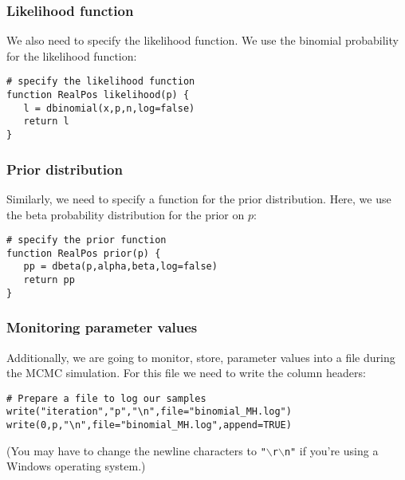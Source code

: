 \subsubsection{Likelihood function}
We also need to specify the likelihood function.
We use the binomial probability for the likelihood function:
{\tt \begin{snugshade*}
\begin{lstlisting}
# specify the likelihood function
function RealPos likelihood(p) {
   l = dbinomial(x,p,n,log=false)
   return l
}
\end{lstlisting}
\end{snugshade*}}

\subsubsection{Prior distribution}
Similarly, we need to specify a function for the prior distribution.
Here, we use the beta probability distribution for the prior on $p$:
{\tt \begin{snugshade*}
\begin{lstlisting}    
# specify the prior function
function RealPos prior(p) {
   pp = dbeta(p,alpha,beta,log=false)
   return pp
}
\end{lstlisting}
\end{snugshade*}}


\subsubsection{Monitoring parameter values}
Additionally, we are going to monitor, \IE store, parameter values into a file during the MCMC simulation.
For this file we need to write the column headers:
{\tt \begin{snugshade*}
\begin{lstlisting}    
# Prepare a file to log our samples
write("iteration","p","\n",file="binomial_MH.log")
write(0,p,"\n",file="binomial_MH.log",append=TRUE)
\end{lstlisting}
\end{snugshade*}}
(You may have to change the newline characters to \texttt{"$\backslash$r$\backslash$n"} if you're using a Windows operating system.)


